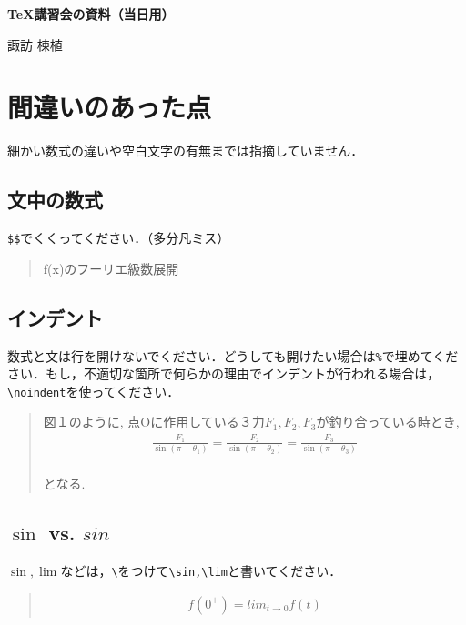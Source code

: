 \documentclass[11pt,a4paper]{jsarticle}
\begin{document}
\begin{center}
  {\Large\bfseries \TeX 講習会の資料（当日用）} %
\end{center}
\begin{flushright}
  {\large 諏訪 棟植} %
\end{flushright}
%
%
\section{間違いのあった点}

細かい数式の違いや空白文字の有無までは指摘していません．

\subsection{文中の数式}

\verb|$$|でくくってください．（多分凡ミス）

\begin{quotation}
  f(x)のフーリエ級数展開
\end{quotation}

\subsection{インデント}

数式と文は行を開けないでください．どうしても開けたい場合は\verb|%|で埋めてください．もし，不適切な箇所で何らかの理由でインデントが行われる場合は，\verb|\noindent|を使ってください．

\begin{quotation}
  図１のように, 点Oに作用している３力$F_1,F_2,F_3$が釣り合っている時とき,
  \begin{align*}
    \frac{F_1}{\sin(\pi-\theta_1)}=\frac{F_2}{\sin(\pi-\theta_2)}=\frac{F_3}{\sin(\pi-\theta_3)} \\
  \end{align*}

  となる.
\end{quotation}

\subsection{$\sin$ vs. $sin$}

$\sin,\lim$などは，\verb|\|をつけて\verb|\sin,\lim|と書いてください．

\begin{quotation}
  \begin{align*}
    f(0^+)=lim_{t \to 0}f(t)
  \end{align*}
\end{quotation}
\end{document}
